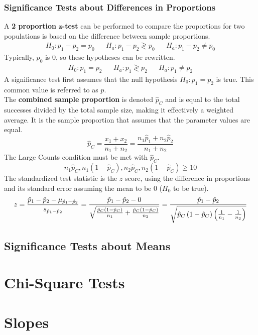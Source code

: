 \documentclass[../AP_Statistics.tex]{subfiles}
\begin{document}
			\subsection*{Significance Tests about Differences in Proportions}
				A \textbf{2 proportion} $\pmb{z}$\textbf{-test} can be performed to compare the proportions for two populations is based on the difference between sample proportions.
				\begin{align*}
					H_0:p_1 - p_2 = p_0 && H_a: p_1 - p_2 \gtrless p_0 && H_a:p_1 - p_2 \ne p_0
				\end{align*}
				Typically, $p_0$ is 0, so these hypotheses can be rewritten.
				\begin{align*}
					H_0:p_1 = p_2 && H_a:p_1 \gtrless p_2 && H_a:p_1 \ne p_2
				\end{align*}
				A significance test first assumes that the null hypothesis $H_0:p_1 = p_2$ is true. This common value is referred to as $p$. \\
				The \textbf{combined sample proportion} is denoted $\hat{p}_C$ and is equal to the total successes divided by the total sample size, making it effectively a weighted average. It is the sample proportion that assumes that the parameter values are equal.
				$$\hat{p}_C = \frac{x_1 + x_2}{n_1 + n_2} = \frac{n_1\hat{p}_1 + n_2\hat{p}_2}{n_1 + n_2}$$
				The Large Counts condition must be met with $\hat{p}_C$.
				$$n_1\hat{p}_C, n_1(1 - \hat{p}_C), n_2\hat{p}_C, n_2(1 - \hat{p}_C) \ge 10$$
				The standardized test statistic is the $z$ score, using the difference in proportions and its standard error assuming the mean to be 0 ($H_0$ to be true).
				$$z = \frac{\hat{p}_1 - \hat{p}_2 - \mu_{\hat{p}_1 - \hat{p}_2}}{s_{\hat{p}_1 - \hat{p}_2}} = \frac{\hat{p}_1 - \hat{p}_2 - 0}{\sqrt{\frac{\hat{p}_C\left(1 - \hat{p}_C\right)}{n_1} + \frac{\hat{p}_C\left(1 - \hat{p}_C\right)}{n_2}}} = \frac{\hat{p}_1 - \hat{p}_2}{\sqrt{\hat{p}_C\left(1 - \hat{p}_C\right)\left(\frac{1}{n_1} - \frac{1}{n_2}\right)}}$$
		\section*{Significance Tests about Means}
	\chapter{Chi-Square Tests}
	\chapter{Slopes}
\end{document}
